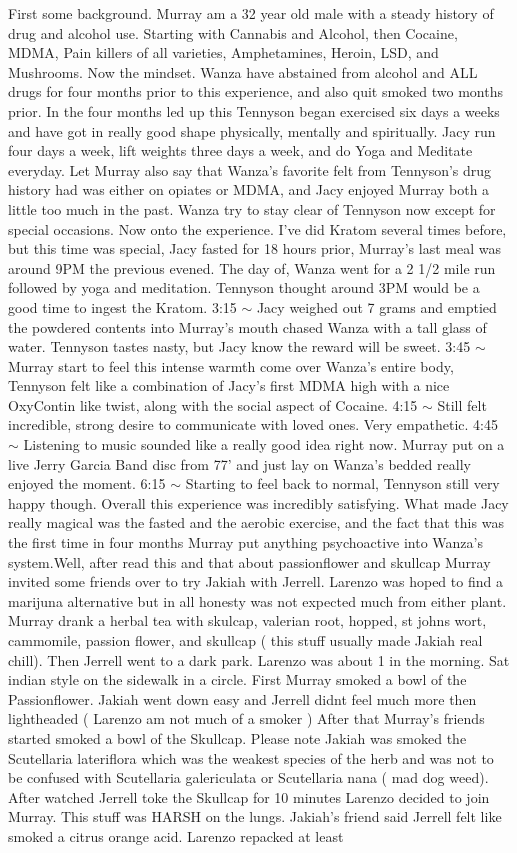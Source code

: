 \documentclass[12pt]{book}
\begin{document}
First some background. Murray am a 32 year old male with a steady history of drug and alcohol use. Starting with Cannabis and Alcohol, then Cocaine, MDMA, Pain killers of all varieties, Amphetamines, Heroin, LSD, and Mushrooms. Now the mindset. Wanza have abstained from alcohol and ALL drugs for four months prior to this experience, and also quit smoked two months prior. In the four months led up this Tennyson began exercised six days a weeks and have got in really good shape physically, mentally and spiritually. Jacy run four days a week, lift weights three days a week, and do Yoga and Meditate everyday. Let Murray also say that Wanza's favorite felt from Tennyson's drug history had was either on opiates or MDMA, and Jacy enjoyed Murray both a little too much in the past. Wanza try to stay clear of Tennyson now except for special occasions. Now onto the experience. I've did Kratom several times before, but this time was special, Jacy fasted for 18 hours prior, Murray's last meal was around 9PM the previous evened. The day of, Wanza went for a 2 1/2 mile run followed by yoga and meditation. Tennyson thought around 3PM would be a good time to ingest the Kratom. 3:15 $\sim$ Jacy weighed out 7 grams and emptied the powdered contents into Murray's mouth chased Wanza with a tall glass of water. Tennyson tastes nasty, but Jacy know the reward will be sweet. 3:45 $\sim$ Murray start to feel this intense warmth come over Wanza's entire body, Tennyson felt like a combination of Jacy's first MDMA high with a nice OxyContin like twist, along with the social aspect of Cocaine. 4:15 $\sim$ Still felt incredible, strong desire to communicate with loved ones. Very empathetic. 4:45 $\sim$ Listening to music sounded like a really good idea right now. Murray put on a live Jerry Garcia Band disc from 77' and just lay on Wanza's bedded really enjoyed the moment. 6:15 $\sim$ Starting to feel back to normal, Tennyson still very happy though. Overall this experience was incredibly satisfying. What made Jacy really magical was the fasted and the aerobic exercise, and the fact that this was the first time in four months Murray put anything psychoactive into Wanza's system.Well, after read this and that about passionflower and skullcap Murray invited some friends over to try Jakiah with Jerrell. Larenzo was hoped to find a marijuna alternative but in all honesty was not expected much from either plant. Murray drank a herbal tea with skulcap, valerian root, hopped, st johns wort, cammomile, passion flower, and skullcap ( this stuff usually made Jakiah real chill). Then Jerrell went to a dark park. Larenzo was about 1 in the morning. Sat indian style on the sidewalk in a circle. First Murray smoked a bowl of the Passionflower. Jakiah went down easy and Jerrell didnt feel much more then lightheaded ( Larenzo am not much of a smoker ) After that Murray's friends started smoked a bowl of the Skullcap. Please note Jakiah was smoked the Scutellaria lateriflora which was the weakest species of the herb and was not to be confused with Scutellaria galericulata or Scutellaria nana ( mad dog weed). After watched Jerrell toke the Skullcap for 10 minutes Larenzo decided to join Murray. This stuff was HARSH on the lungs. Jakiah's friend said Jerrell felt like smoked a citrus orange acid. Larenzo repacked at least 
\end{document}
